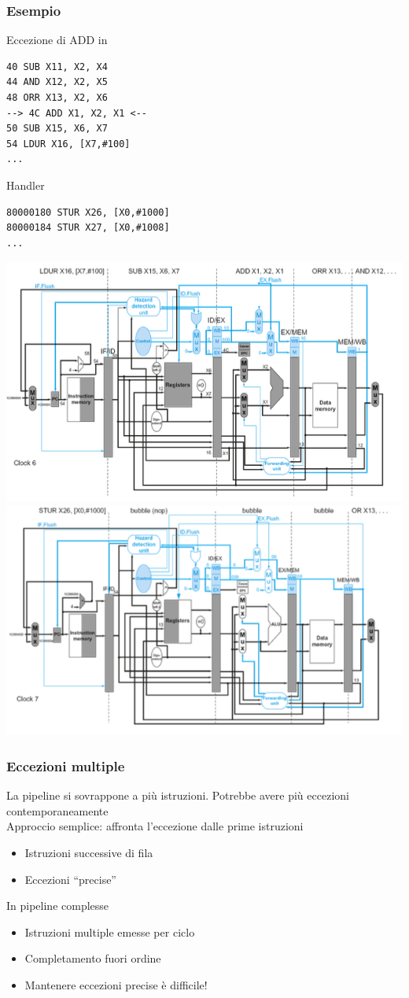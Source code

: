 \documentclass[12pt,a4paper]{article}
\begin{document}
\subsubsection{Esempio}
Eccezione di ADD in
\begin{verbatim}
40 SUB X11, X2, X4
44 AND X12, X2, X5
48 ORR X13, X2, X6
--> 4C ADD X1, X2, X1 <--
50 SUB X15, X6, X7
54 LDUR X16, [X7,#100]
...
\end{verbatim}
Handler
\begin{verbatim}
80000180 STUR X26, [X0,#1000]
80000184 STUR X27, [X0,#1008]
...
\end{verbatim}
\begin{center}
\includegraphics[width=0.6\columnwidth]{img/exeption_example1.png}
\includegraphics[width=0.6\columnwidth]{img/exeption_example2.png}
\end{center}
\subsubsection{Eccezioni multiple}
La pipeline si sovrappone a più istruzioni. Potrebbe avere più eccezioni contemporaneamente\\
Approccio semplice: affronta l'eccezione dalle prime istruzioni
\begin{itemize}
\item Istruzioni successive di fila
\item Eccezioni “precise”
\end{itemize}
In pipeline complesse
\begin{itemize}
\item Istruzioni multiple emesse per ciclo
\item Completamento fuori ordine
\item Mantenere eccezioni precise è difficile!
\end{itemize}
\end{document}
